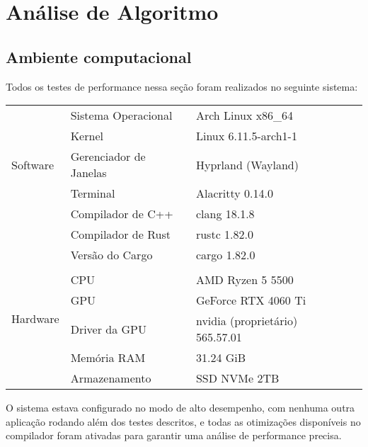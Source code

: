 \chapter{Análise de Algoritmo}
\label{ch:anal_de_alg} %

\section{Ambiente computacional}

Todos os testes de performance nessa seção foram realizados no seguinte sistema:

\begin{table}[!ht]
	\centering
	\begin{tabular}{llll}
		\toprule
		\multirow{5}{3cm}{Software}
		 & Sistema Operacional    & Arch Linux x86\_64              & \\
		 & Kernel                 & Linux 6.11.5-arch1-1            & \\
		 & Gerenciador de Janelas & Hyprland (Wayland)              & \\
		 & Terminal               & Alacritty 0.14.0                & \\
		 & Compilador de C++      & clang 18.1.8                    & \\
		 & Compilador de Rust     & rustc 1.82.0                    & \\
		 & Versão do Cargo        & cargo 1.82.0                    & \\
		 &                        &                                 & \\
		\multirow{4}{3cm}{Hardware}
		 & CPU                    & AMD Ryzen 5 5500                & \\
		 & GPU                    & GeForce RTX 4060 Ti             & \\
		 & Driver da GPU          & nvidia (proprietário) 565.57.01 & \\
		 & Memória RAM            & 31.24 GiB                       & \\
		 & Armazenamento          & SSD NVMe 2TB                    & \\
		\bottomrule
	\end{tabular}
\end{table}

\noindent
O sistema estava configurado no modo de alto desempenho, com nenhuma outra aplicação rodando além dos testes descritos, e todas as otimizações disponíveis no compilador foram ativadas para garantir uma análise de performance precisa.









